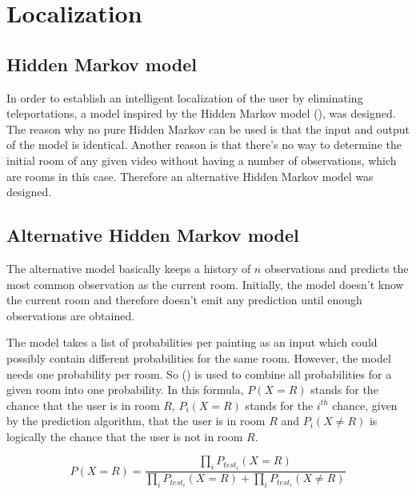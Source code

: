 \section{Localization}
\label{sec:localization}

\subsection{Hidden Markov model}
\label{subsec:hidden-markov}

In order to establish an intelligent localization of the user by eliminating teleportations, a model inspired by the Hidden Markov model (\cite{eddy1996hidden}), was designed. The reason why no pure Hidden Markov can be used is that the input and output of the model is identical. Another reason is that there's no way to determine the initial room of any given video without having a number of observations, which are rooms in this case. Therefore an alternative Hidden Markov model was designed. \cite{jurafsky2014speech}

\subsection{Alternative Hidden Markov model}
\label{subsec:alternative-hidden-markov}

The alternative model basically keeps a history of $n$ observations and predicts the most common observation as the current room. Initially, the model doesn't know the current room and therefore doesn't emit any prediction until enough observations are obtained.

The model takes a list of probabilities per painting as an input which could possibly contain different probabilities for the same room. However, the model needs one probability per room. So  (\cite{genest1986combining}) is used to combine all probabilities for a given room into one probability. In this formula, $P(X = R)$ stands for the chance that the user is in room $R$, $P_{i}(X = R)$ stands for the $i^{th}$ chance, given by the prediction algorithm, that the user is in room $R$ and $P_{i}(X \ne R)$ is logically the chance that the user is not in room $R$.

\begin{equation}
    \label{eq:combine-chances}
    P(X = R) = \frac{\prod_{i} P_{test_i}(X = R)}{\prod_{i} P_{test_i}(X = R) + \prod_{i} P_{test_i}(X \ne R)}
\end{equation}

